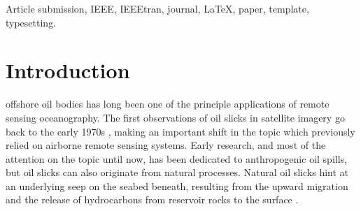 \documentclass[journal]{IEEEtran}
\begin{document}
\begin{abstract}
    This document describes the most common article elements and how to use the IEEEtran class with \LaTeX \ to produce files that are suitable for submission to the IEEE.  
    IEEEtran can produce conference, journal, and technical note (correspondence) papers with a suitable choice of class options. 
    This document describes the most common article elements and how to use the IEEEtran class with \LaTeX \ to produce files that are suitable for submission to the IEEE.  
    IEEEtran can produce conference, journal, and technical note (correspondence) papers with a suitable choice of class options. 
    This document describes the most common article elements and how to use the IEEEtran class with \LaTeX \ to produce files that are suitable for submission to the IEEE.  
    IEEEtran can produce conference, journal, and technical note (correspondence) papers with a suitable choice of class options. 
    This document describes the most common article elements and how to use the IEEEtran class with \LaTeX \ to produce files that are suitable for submission to the IEEE.  
    The entirety of the data and Python code used in this study are provided in an open-access online repository.
\end{abstract}

\begin{IEEEkeywords}
    Article submission, IEEE, IEEEtran, journal, \LaTeX, paper, template, typesetting.
\end{IEEEkeywords}

\section{Introduction}
 offshore oil bodies has long  been one of the principle applications of remote sensing oceanography. 
The first observations of oil slicks in satellite imagery go back to the early 1970s \cite{deutschUseLandsatData1977,stumpfERTS1ViewsOil1974}, 
making an important shift in the topic which previously relied on airborne remote sensing systems. Early research, and most of the attention on the topic until now, 
has been dedicated to anthropogenic oil spills, but oil slicks can also originate from natural processes. 
Natural oil slicks hint at an underlying seep on the seabed beneath, resulting from the upward migration and the release of hydrocarbons from reservoir rocks to the surface
\cite{huntPetroleumGeochemistryGeology1979,linkSignificanceOilGas1952,juddSeabedFluidFlow2009,marshakEarthPortraitPlanet2005}.
\end{document}
